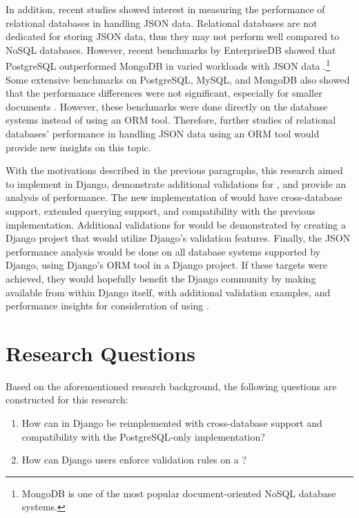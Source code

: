In addition, recent studies showed interest in measuring the performance of
relational databases in handling JSON data. Relational databases are not
dedicated for storing JSON data, thus they may not perform well compared to
NoSQL databases. However, recent benchmarks by EnterpriseDB showed that
PostgreSQL outperformed MongoDB in varied workloads with JSON data
\cite{enterprisedb_benchmark}.\footnote{MongoDB is one of the most popular
document-oriented NoSQL database systems.} Some extensive benchmarks on
PostgreSQL, MySQL, and MongoDB also showed that the performance differences
were not significant, especially for smaller documents \cite{dolgov_benchmark}.
However, these benchmarks were done directly on the database systems instead of
using an ORM tool. Therefore, further studies of relational databases'
performance in handling JSON data using an ORM tool would provide new insights
on this topic.

With the motivations described in the previous paragraphs, this research aimed
to implement  in Django, demonstrate additional validations for
, and provide an analysis of  performance. The
new implementation of  would have cross-database support,
extended querying support, and compatibility with the previous 
implementation. Additional validations for  would be
demonstrated by creating a Django project that would utilize Django's
validation features. Finally, the JSON performance analysis would be done on
all database systems supported by Django, using Django's ORM tool in a Django
project. If these targets were achieved, they would hopefully benefit the
Django community by making  available from within Django
itself, with additional validation examples, and performance insights for
consideration of using .

\section{Research Questions}

Based on the aforementioned research background, the following questions are
constructed for this research:

\begin{enumerate}
    \item How can  in Django be reimplemented with
          cross-database support and compatibility with the PostgreSQL-only
           implementation?
    \item How can Django users enforce validation rules on a ?
\end{enumerate}

